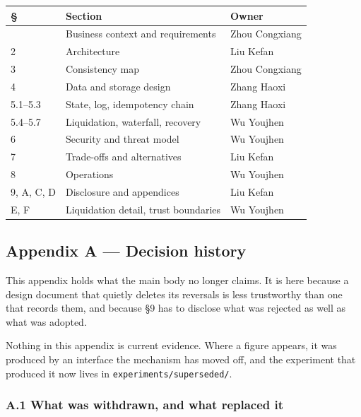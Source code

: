 \documentclass[10pt,a4paper]{article}
\newcounter{none}  %
\begin{document}
{\def\LTcaptype{none} %
\begin{longtable}[]{@{}lll@{}}
\toprule\noalign{}
§ & Section & Owner \\
\midrule\noalign{}
\endhead
\bottomrule\noalign{}
\endlastfoot
1 & Business context and requirements & Zhou Congxiang \\
2 & Architecture & Liu Kefan \\
3 & Consistency map & Zhou Congxiang \\
4 & Data and storage design & Zhang Haoxi \\
5.1--5.3 & State, log, idempotency chain & Zhang Haoxi \\
5.4--5.7 & Liquidation, waterfall, recovery & Wu Youjhen \\
6 & Security and threat model & Wu Youjhen \\
7 & Trade-offs and alternatives & Liu Kefan \\
8 & Operations & Wu Youjhen \\
9, A, C, D & Disclosure and appendices & Liu Kefan \\
E, F & Liquidation detail, trust boundaries & Wu Youjhen \\
\end{longtable}
}



\label{start:11}%

\subsection{Appendix A --- Decision history}\label{appendix-a-decision-history}

This appendix holds what the main body no longer claims. It is here because a
design document that quietly deletes its reversals is less trustworthy than one
that records them, and because §9 has to disclose what was rejected as well as
what was adopted.

Nothing in this appendix is current evidence. Where a figure appears, it was
produced by an interface the mechanism has moved off, and the experiment that
produced it now lives in \texttt{experiments/superseded/}.

\subsubsection{A.1 What was withdrawn, and what replaced it}\label{a.1-what-was-withdrawn-and-what-replaced-it}
\end{document}

